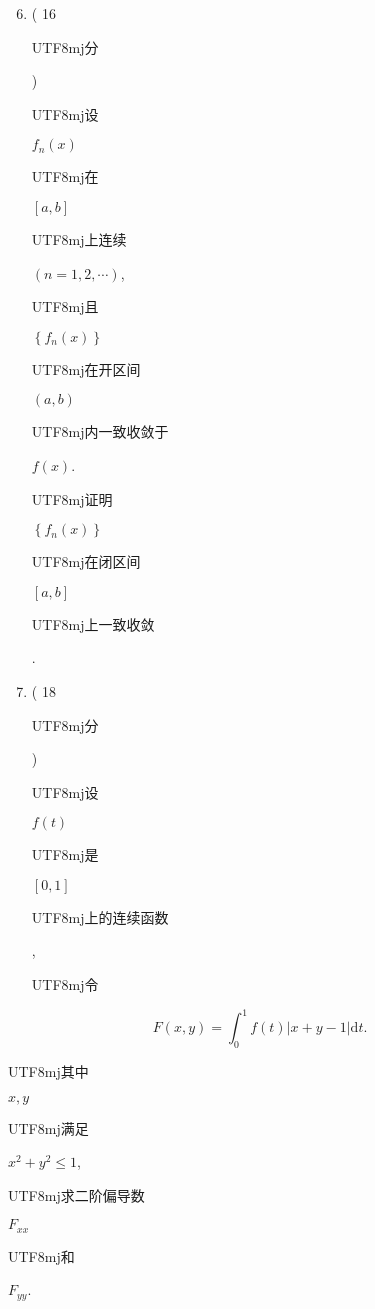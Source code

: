\documentclass[10pt]{article}
\begin{document}
\begin{enumerate}
  \setcounter{enumi}{5}
  \item ( 16 \begin{CJK}{UTF8}{mj}分\end{CJK}) \begin{CJK}{UTF8}{mj}设\end{CJK} $f_{n}(x)$ \begin{CJK}{UTF8}{mj}在\end{CJK} $[a, b]$ \begin{CJK}{UTF8}{mj}上连续\end{CJK} $(n=1,2, \cdots)$, \begin{CJK}{UTF8}{mj}且\end{CJK} $\left\{f_{n}(x)\right\}$ \begin{CJK}{UTF8}{mj}在开区间\end{CJK} $(a, b)$ \begin{CJK}{UTF8}{mj}内一致收敛于\end{CJK} $f(x)$. \begin{CJK}{UTF8}{mj}证明\end{CJK} $\left\{f_{n}(x)\right\}$ \begin{CJK}{UTF8}{mj}在闭区间\end{CJK} $[a, b]$ \begin{CJK}{UTF8}{mj}上一致收敛\end{CJK}.

  \item ( 18 \begin{CJK}{UTF8}{mj}分\end{CJK}) \begin{CJK}{UTF8}{mj}设\end{CJK} $f(t)$ \begin{CJK}{UTF8}{mj}是\end{CJK} $[0,1]$ \begin{CJK}{UTF8}{mj}上的连续函数\end{CJK}, \begin{CJK}{UTF8}{mj}令\end{CJK}

\end{enumerate}
$$
F(x, y)=\int_{0}^{1} f(t)|x+y-1| \mathrm{d} t .
$$
\begin{CJK}{UTF8}{mj}其中\end{CJK} $x, y$ \begin{CJK}{UTF8}{mj}满足\end{CJK} $x^{2}+y^{2} \leqslant 1$, \begin{CJK}{UTF8}{mj}求二阶偏导数\end{CJK} $F_{x x}$ \begin{CJK}{UTF8}{mj}和\end{CJK} $F_{y y}$.
\end{document}
